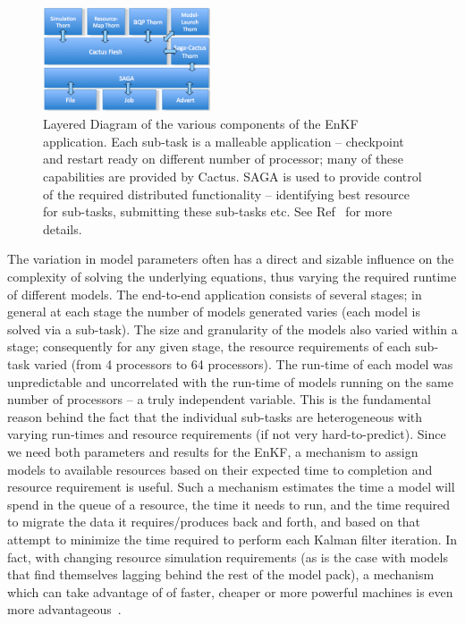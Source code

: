 \documentclass{llncs}
\begin{document}
\begin{figure}[htbp]
    \centering
    \includegraphics[width=0.44\textwidth]{kalmanfilterlayer.png}
    \caption{Layered Diagram of the various components of the EnKF
      application. Each sub-task is a malleable application --
      checkpoint and restart ready on different number of processor;
      many of these capabilities are provided by Cactus.  SAGA is used
      to provide control of the required distributed functionality --
      identifying best resource for sub-tasks, submitting these
      sub-tasks etc. See Ref~\cite{saga_tg08} for more details.\up\up}
    \label{fig:kalmanfilter}
\end{figure}  

The variation in model parameters often has a direct and sizable
influence on the complexity of solving the underlying equations, thus
varying the required runtime of different models.  The end-to-end
application consists of several stages; in general at each stage the
number of models generated varies (each model is solved via a
sub-task). The size and granularity of the models also varied within a
stage; consequently for any given stage, the resource requirements of
each sub-task varied (from 4 processors to 64 processors). The
run-time of each model was unpredictable and uncorrelated with the
run-time of models running on the same number of processors – a truly
independent variable.  This is the fundamental reason behind the fact
that the individual sub-tasks are heterogeneous with varying run-times
and resource requirements (if not very hard-to-predict).  Since we
need both parameters and results for the EnKF, a mechanism to assign
models to available resources based on their expected time to
completion and resource requirement is useful.  Such a mechanism
estimates the time a model will spend in the queue of a resource, the
time it needs to run, and the time required to migrate the data it
requires/produces back and forth, and based on that attempt to
minimize the time required to perform each Kalman filter iteration.
In fact, with changing resource simulation requirements (as is the
case with models that find themselves lagging behind the rest of the
model pack), a mechanism which can take advantage of of faster,
cheaper or more powerful machines is even more
advantageous~\cite{escience07}.
\end{document}
